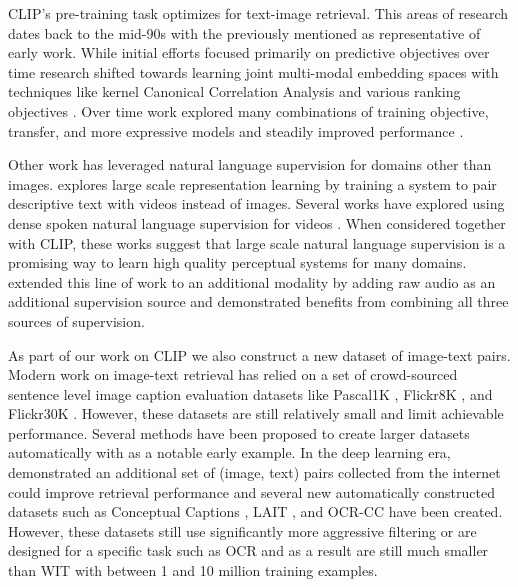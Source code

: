 \documentclass{article}
\begin{document}
CLIP's pre-training task optimizes for text-image retrieval. This areas of research dates back to the mid-90s with the previously mentioned \citet{mori1999image} as representative of early work. While initial efforts focused primarily on predictive objectives over time research shifted towards learning joint multi-modal embedding spaces with techniques like kernel Canonical Correlation Analysis and various ranking objectives \citep{weston2010large,socher2010connecting,hodosh2013framing}. Over time work explored many combinations of training objective, transfer, and more expressive models and steadily improved performance \citep{frome2013devise,socher2014grounded,karpathy2014deep,kiros2014unifying,faghri2017vse++}.

Other work has leveraged natural language supervision for domains other than images. \citet{stroud2020learning} explores large scale representation learning by training a system to pair descriptive text with videos instead of images. Several works have explored using dense spoken natural language supervision for videos \citep{miech2019howto100m,miech2020end}. When considered together with CLIP, these works suggest that large scale natural language supervision is a promising way to learn high quality perceptual systems for many domains. \citet{alayrac2020self} extended this line of work to an additional modality by adding raw audio as an additional supervision source and demonstrated benefits from combining all three sources of supervision.

As part of our work on CLIP we also construct a new dataset of image-text pairs. Modern work on image-text retrieval has relied on a set of crowd-sourced sentence level image caption evaluation datasets like Pascal1K \citep{rashtchian2010collecting}, Flickr8K \citep{hodosh2013framing}, and Flickr30K \citep{young2014image}. However, these datasets are still relatively small and limit achievable performance. Several methods have been proposed to create larger datasets automatically with \citet{ordonez2011im2text} as a notable early example. In the deep learning era, \citet{mithun2018webly} demonstrated an additional set of (image, text) pairs collected from the internet could improve retrieval performance and several new automatically constructed datasets such as Conceptual Captions \citep{sharma2018conceptual}, LAIT \citep{qi2020imagebert}, and OCR-CC \citep{yang2020tap} have been created. However, these datasets still use significantly more aggressive filtering or are designed for a specific task such as OCR and as a result are still much smaller than WIT with between 1 and 10 million training examples.
\end{document}
